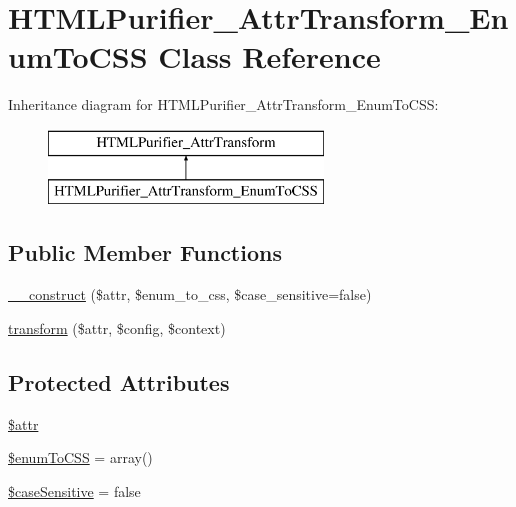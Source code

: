 \hypertarget{classHTMLPurifier__AttrTransform__EnumToCSS}{\section{H\+T\+M\+L\+Purifier\+\_\+\+Attr\+Transform\+\_\+\+Enum\+To\+C\+S\+S Class Reference}
\label{classHTMLPurifier__AttrTransform__EnumToCSS}
}
Inheritance diagram for H\+T\+M\+L\+Purifier\+\_\+\+Attr\+Transform\+\_\+\+Enum\+To\+C\+S\+S\+:\begin{figure}[H]
\begin{center}
\leavevmode
\includegraphics[height=2.000000cm]{classHTMLPurifier__AttrTransform__EnumToCSS}
\end{center}
\end{figure}
\subsection*{Public Member Functions}
\begin{DoxyCompactItemize}
\item 
\hyperlink{classHTMLPurifier__AttrTransform__EnumToCSS_aac6ed10cc43cb30cbb7d320eb5470f38}{\+\_\+\+\_\+construct} (\$attr, \$enum\+\_\+to\+\_\+css, \$case\+\_\+sensitive=false)
\item 
\hyperlink{classHTMLPurifier__AttrTransform__EnumToCSS_a2df184b94c8a71e32c0e118996b480f9}{transform} (\$attr, \$config, \$context)
\end{DoxyCompactItemize}
\subsection*{Protected Attributes}
\begin{DoxyCompactItemize}
\item 
\hyperlink{classHTMLPurifier__AttrTransform__EnumToCSS_abf0edf37a0956030cbf115dc67a524b6}{\$attr}
\item 
\hyperlink{classHTMLPurifier__AttrTransform__EnumToCSS_a8ccbc09476300832cb12fa0c2ce1181d}{\$enum\+To\+C\+S\+S} = array()
\item 
\hyperlink{classHTMLPurifier__AttrTransform__EnumToCSS_a009481d77e57d9880f2be25b9e2e6303}{\$case\+Sensitive} = false
\end{DoxyCompactItemize}


